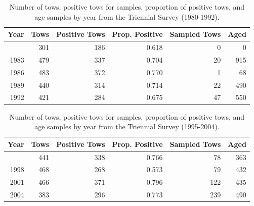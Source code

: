\documentclass[
  english,
]{article}
\begin{document}
\begingroup
\fontsize{9.0pt}{11.0pt}\selectfont

\begin{longtable}{rrrrrr}

\caption{\label{tbl-tri-early-samples}Number of tows, positive tows for
samples, proportion of positive tows, and age samples by year from the
Triennial Survey (1980-1992).}

\tabularnewline

\toprule
Year & Tows & Positive Tows & Prop. Positive & Sampled Tows & Aged \\ 
\midrule\addlinespace[2.5pt]
1980 & 301 & 186 & 0.618 & 0 & 0 \\ 
1983 & 479 & 337 & 0.704 & 20 & 915 \\ 
1986 & 483 & 372 & 0.770 & 1 & 68 \\ 
1989 & 440 & 314 & 0.714 & 22 & 490 \\ 
1992 & 421 & 284 & 0.675 & 47 & 550 \\ 
\bottomrule

\end{longtable}

\endgroup

\begingroup
\fontsize{9.0pt}{11.0pt}\selectfont

\begin{longtable}{rrrrrr}

\caption{\label{tbl-tri-late-samples}Number of tows, positive tows for
samples, proportion of positive tows, and age samples by year from the
Triennial Survey (1995-2004).}

\tabularnewline

\toprule
Year & Tows & Positive Tows & Prop. Positive & Sampled Tows & Aged \\ 
\midrule\addlinespace[2.5pt]
1995 & 441 & 338 & 0.766 & 78 & 363 \\ 
1998 & 468 & 268 & 0.573 & 79 & 432 \\ 
2001 & 466 & 371 & 0.796 & 122 & 435 \\ 
2004 & 383 & 296 & 0.773 & 239 & 490 \\ 
\bottomrule

\end{longtable}

\endgroup

\pagebreak

\begingroup
\fontsize{8.0pt}{9.0pt}\selectfont
\end{document}
